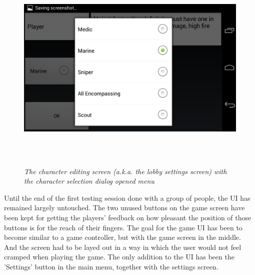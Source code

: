 \documentclass{article}
\begin{document}
\begin{figure}
\includegraphics[height=4in,width=7.12in]{./images/android_screenshots/first_development/game_first_development_10.png}
\caption{\small \sl The character editing screen (a.k.a. the lobby settings
screen) with the character selection dialog opened
menu\label{fig:lobby_settings_2}}
\end{figure}

Until the end of the first testing session done with a group of people, the UI
has remained largely untouched. The two unused buttons on the game screen have
been kept for getting the players' feedback on how pleasant the position of
those buttons is for the reach of their fingers. The goal for the game UI has
been to become similar to a game controller, but with the game screen in the
middle. And the screen had to be layed out in a way in which the user would not
feel cramped when playing the game. The only addition to the UI has been
the 'Settings' button in the main menu, together with the settings
screen.\newline
\end{document}
